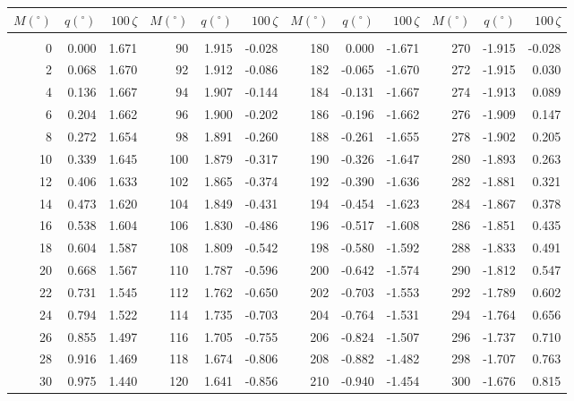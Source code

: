 \newpage
\begin{table}\centering
\small{ \begin{tabular}{rrr|rrr|rrr|rrr}
$M(^\circ)$ & $q(^\circ)$  & $100\,\zeta$ & $M(^\circ)$ & $q(^\circ)$  & $100\,\zeta$ & $M(^\circ)$ & $q(^\circ)$  & $100\,\zeta$& $M(^\circ)$ & $q(^\circ)$  & $100\,\zeta$\\\hline
&&&&&&&&&&&\\[-1.75ex]
  0 &  0.000 &  1.671 &  90 &  1.915 & -0.028 & 180 &  0.000 & -1.671 & 270 & -1.915 & -0.028\\
  2 &  0.068 &  1.670 &  92 &  1.912 & -0.086 & 182 & -0.065 & -1.670 & 272 & -1.915 &  0.030\\
  4 &  0.136 &  1.667 &  94 &  1.907 & -0.144 & 184 & -0.131 & -1.667 & 274 & -1.913 &  0.089\\
  6 &  0.204 &  1.662 &  96 &  1.900 & -0.202 & 186 & -0.196 & -1.662 & 276 & -1.909 &  0.147\\
  8 &  0.272 &  1.654 &  98 &  1.891 & -0.260 & 188 & -0.261 & -1.655 & 278 & -1.902 &  0.205\\
 10 &  0.339 &  1.645 & 100 &  1.879 & -0.317 & 190 & -0.326 & -1.647 & 280 & -1.893 &  0.263\\
 12 &  0.406 &  1.633 & 102 &  1.865 & -0.374 & 192 & -0.390 & -1.636 & 282 & -1.881 &  0.321\\
 14 &  0.473 &  1.620 & 104 &  1.849 & -0.431 & 194 & -0.454 & -1.623 & 284 & -1.867 &  0.378\\
 16 &  0.538 &  1.604 & 106 &  1.830 & -0.486 & 196 & -0.517 & -1.608 & 286 & -1.851 &  0.435\\
 18 &  0.604 &  1.587 & 108 &  1.809 & -0.542 & 198 & -0.580 & -1.592 & 288 & -1.833 &  0.491\\
 20 &  0.668 &  1.567 & 110 &  1.787 & -0.596 & 200 & -0.642 & -1.574 & 290 & -1.812 &  0.547\\
 22 &  0.731 &  1.545 & 112 &  1.762 & -0.650 & 202 & -0.703 & -1.553 & 292 & -1.789 &  0.602\\
 24 &  0.794 &  1.522 & 114 &  1.735 & -0.703 & 204 & -0.764 & -1.531 & 294 & -1.764 &  0.656\\
 26 &  0.855 &  1.497 & 116 &  1.705 & -0.755 & 206 & -0.824 & -1.507 & 296 & -1.737 &  0.710\\
 28 &  0.916 &  1.469 & 118 &  1.674 & -0.806 & 208 & -0.882 & -1.482 & 298 & -1.707 &  0.763\\
 30 &  0.975 &  1.440 & 120 &  1.641 & -0.856 & 210 & -0.940 & -1.454 & 300 & -1.676 &  0.815\\

\end{tabular}}
\end{table}
